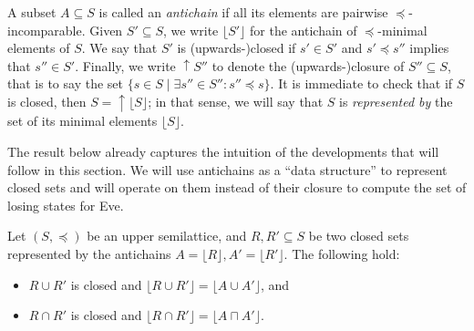 \documentclass[runningheads,a4paper,draft]{llncs}
\newcommand{\eve}{Eve\xspace}
\newcommand{\closeup}[1]{\mathrm{\uparrow} #1}
\begin{document}
A subset $A \subseteq S$ is called an \emph{antichain} if all its elements are
pairwise $\preceq$-incomparable.  Given $S' \subseteq S$, we write $\lfloor S'
\rfloor$ for the antichain of $\preceq$-minimal elements of $S$. We say that
$S'$ is (upwards-)closed if $s' \in S'$ and $s' \preceq s''$ implies that $s''
\in S'$. Finally, we write $\closeup{S''}$ to denote the (upwards-)closure of
$S'' \subseteq S$, that is to say the set $\{s \in S \mid \exists s'' \in S''
: s'' \preceq s\}$.  It is immediate to check that if \(S\) is closed, then
\(S = \closeup{\lfloor S \rfloor}\); in that sense, we will say that \(S\) is \emph{represented
  by} the set of its minimal elements \(\lfloor S \rfloor\).

The result below already captures the intuition of the developments that
will follow in this section. We will use antichains as a ``data structure'' to
represent closed sets and will operate on them instead of their closure to
compute the set of losing states for \eve.
\begin{proposition}\label{pro:antichains}
  Let $(S, \preceq)$ be an upper semilattice, and $R,R' \subseteq S$ be two
  closed sets represented by the antichains $A = \lfloor R \rfloor, A' =
  \lfloor R' \rfloor$. The following hold:
  \begin{itemize}
    \item $R \cup R'$ is closed and $\lfloor R \cup R' \rfloor = \lfloor A
      \cup A'\rfloor$, and
    \item $R \cap R'$ is closed and $\lfloor R \cap R' \rfloor = \lfloor A
      \sqcap A'\rfloor$.
  \end{itemize}
\end{proposition}
\end{document}
